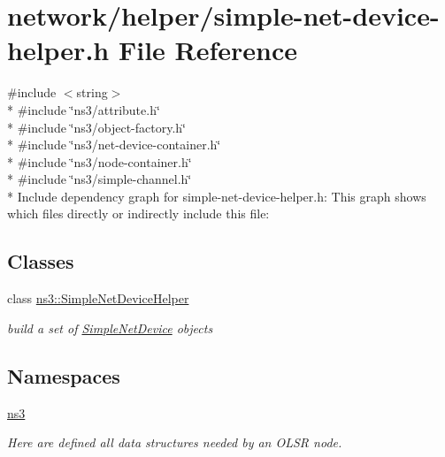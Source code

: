 \hypertarget{simple-net-device-helper_8h}{}\section{network/helper/simple-\/net-\/device-\/helper.h File Reference}
\label{simple-net-device-helper_8h}
{\ttfamily \#include $<$string$>$}\\*
{\ttfamily \#include \char`\"{}ns3/attribute.\+h\char`\"{}}\\*
{\ttfamily \#include \char`\"{}ns3/object-\/factory.\+h\char`\"{}}\\*
{\ttfamily \#include \char`\"{}ns3/net-\/device-\/container.\+h\char`\"{}}\\*
{\ttfamily \#include \char`\"{}ns3/node-\/container.\+h\char`\"{}}\\*
{\ttfamily \#include \char`\"{}ns3/simple-\/channel.\+h\char`\"{}}\\*
Include dependency graph for simple-\/net-\/device-\/helper.h\+:
This graph shows which files directly or indirectly include this file\+:
\subsection*{Classes}
\begin{DoxyCompactItemize}
\item 
class \hyperlink{classns3_1_1SimpleNetDeviceHelper}{ns3\+::\+Simple\+Net\+Device\+Helper}
\begin{DoxyCompactList}\small\item\em build a set of \hyperlink{classns3_1_1SimpleNetDevice}{Simple\+Net\+Device} objects \end{DoxyCompactList}\end{DoxyCompactItemize}
\subsection*{Namespaces}
\begin{DoxyCompactItemize}
\item 
 \hyperlink{namespacens3}{ns3}
\begin{DoxyCompactList}\small\item\em Here are defined all data structures needed by an O\+L\+SR node. \end{DoxyCompactList}\end{DoxyCompactItemize}
